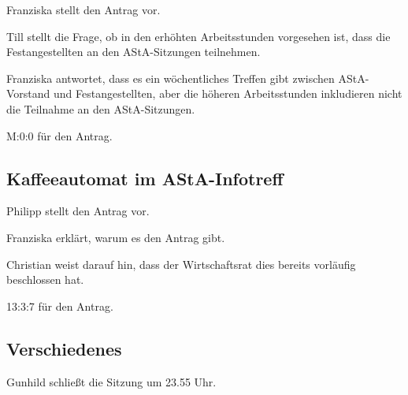 \documentclass[ngerman,headheight=70pt]{scrartcl}
\begin{document}
    Franziska stellt den Antrag vor.

    Till stellt die Frage, ob in den erhöhten Arbeitsstunden vorgesehen ist,
    dass die Festangestellten an den AStA-Sitzungen teilnehmen.

    Franziska antwortet, dass es ein wöchentliches Treffen gibt zwischen AStA-Vorstand
    und Festangestellten, aber die höheren Arbeitsstunden inkludieren nicht
    die Teilnahme an den AStA-Sitzungen.

    M:0:0 für den Antrag.

    \subsection{Kaffeeautomat im AStA-Infotreff}

    Philipp stellt den Antrag vor.

    Franziska erklärt, warum es den Antrag gibt.

    Christian weist darauf hin, dass der Wirtschaftsrat dies bereits vorläufig
    beschlossen hat.

    13:3:7 für den Antrag.

    \subsection{Verschiedenes}

    Gunhild schließt die Sitzung um 23.55 Uhr.
\end{document}
